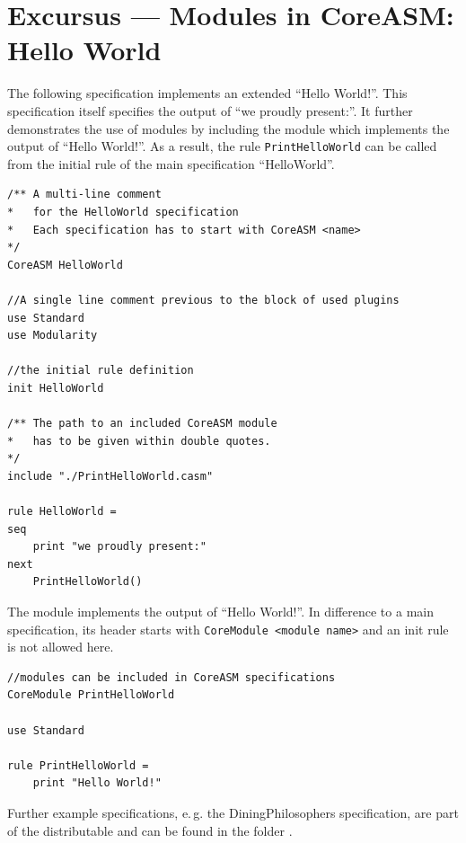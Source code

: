 \documentclass[10pt,oneside,a4paper]{article}
\begin{document}
\section{Excursus --- Modules in CoreASM: Hello World}\label{ch:hello-world}
The following specification  implements an extended ``Hello World!''. This specification itself specifies the output of ``we proudly present:''. It further demonstrates the use of modules by including the module  which implements the output of ``Hello World!''. As a result, the rule \texttt{PrintHelloWorld} can be called from the initial rule of the main specification ``HelloWorld''.
\begin{lstlisting}
/** A multi-line comment
*   for the HelloWorld specification
*   Each specification has to start with CoreASM <name>
*/
CoreASM HelloWorld

//A single line comment previous to the block of used plugins
use Standard
use Modularity

//the initial rule definition
init HelloWorld

/** The path to an included CoreASM module
*   has to be given within double quotes.
*/
include "./PrintHelloWorld.casm"

rule HelloWorld =
seq
	print "we proudly present:"
next
	PrintHelloWorld()
\end{lstlisting}
The module  implements the output of ``Hello World!''. In difference to a main specification, its header starts with \texttt{CoreModule <module name>} and an init rule is not allowed here.
\begin{lstlisting}
//modules can be included in CoreASM specifications
CoreModule PrintHelloWorld

use Standard

rule PrintHelloWorld =
	print "Hello World!"
\end{lstlisting}

Further example specifications, e.\,g. the DiningPhilosophers specification, are part of the distributable and can be found in the folder .

{}


\end{document}
